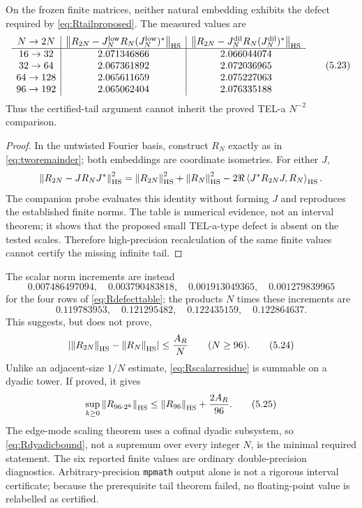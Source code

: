 \begin{proposition}\label{prop:tailfailure}
On the frozen finite matrices, neither natural embedding exhibits the
defect required by \eqref{eq:Rtailproposed}.  The measured values are
\[
\begin{array}{c|c|c}
N\to2N&
\left\lVert R_{2N}-J_N^{\rm low}R_N(J_N^{\rm low})^*\right\rVert_{\mathrm{HS}}&
\left\lVert R_{2N}-J_N^{\rm dil}R_N(J_N^{\rm dil})^*\right\rVert_{\mathrm{HS}}\\ \hline
16\to32&2.071346866&2.066044074\\
32\to64&2.067361892&2.072036965\\
64\to128&2.065611659&2.075227063\\
96\to192&2.065062404&2.076335188
\end{array}
\tag{5.23}\label{eq:Rdefecttable}
\]
Thus the certified-tail argument cannot inherit the proved TEL-a
$N^{-2}$ comparison.
\end{proposition}

\begin{proof}
In the untwisted Fourier basis, construct $R_N$ exactly as in
\eqref{eq:tworemainder}; both embeddings are coordinate isometries.
For either $J$,
\[
 \left\lVert R_{2N}-JR_NJ^*\right\rVert_{\mathrm{HS}}^2
 =\left\lVert R_{2N}\right\rVert_{\mathrm{HS}}^2+\left\lVert R_N\right\rVert_{\mathrm{HS}}^2
 -2\Re\left\langle J^*R_{2N}J,R_N\right\rangle_{\mathrm{HS}}.
\]
The companion probe evaluates this identity without forming $J$ and
reproduces the established finite norms.  The table is numerical
evidence, not an interval theorem; it shows that the proposed small
TEL-a-type defect is absent on the tested scales.  Therefore
high-precision recalculation of the same finite values cannot certify
the missing infinite tail.
\end{proof}

\begin{remark}
The scalar norm increments are instead
\[
 0.007486497094,\quad0.003790483818,\quad
 0.001913049365,\quad0.001279839965
\]
for the four rows of \eqref{eq:Rdefecttable}; the products $N$ times
these increments are
\[
 0.119783953,\quad0.121295482,\quad
 0.122435159,\quad0.122864637.
\]
This suggests, but does not prove,
\[
 \left|\left\lVert R_{2N}\right\rVert_{\mathrm{HS}}-\left\lVert R_N\right\rVert_{\mathrm{HS}}\right|
 \le\frac{A_R}{N}\qquad(N\ge96).
\tag{5.24}\label{eq:Rscalarresidue}
\]
Unlike an adjacent-size $1/N$ estimate, \eqref{eq:Rscalarresidue} is
summable on a dyadic tower.  If proved, it gives
\[
 \sup_{k\ge0}\left\lVert R_{96\cdot2^k}\right\rVert_{\mathrm{HS}}
 \le\left\lVert R_{96}\right\rVert_{\mathrm{HS}}+\frac{2A_R}{96}.
\tag{5.25}\label{eq:Rdyadicbound}
\]
The edge-mode scaling theorem uses a cofinal dyadic subsystem, so
\eqref{eq:Rdyadicbound}, not a supremum over every integer $N$, is the
minimal required statement.  The six reported finite values are
ordinary double-precision diagnostics.  Arbitrary-precision
\texttt{mpmath} output alone is not a rigorous interval certificate;
because the prerequisite tail theorem failed, no floating-point value
is relabelled as certified.
\end{remark}

